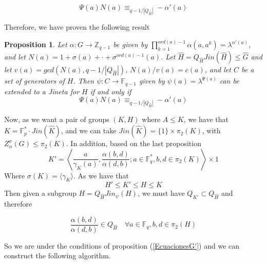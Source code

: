 \documentclass{article}
\newtheorem{proposition}[theorem]{Proposition}
\begin{document}
\begin{equation*}
   \Psi(a)N(a) \equiv_{q-1 /  |Q_{\hat{H}}| } - \alpha'(a)
\end{equation*}

Therefore, we have proven the following result
\begin{proposition}
 Let $\alpha:G\longrightarrow \mathbb{Z}_{q-1}$ be given by $\prod_{k=1}^{ord(a)-1}\alpha(a,a^k) = \lambda^{\alpha'(a)}$, and let $N(a) = 1 + \sigma(a) + \cdot + \sigma^{ord(a)-1}(a)$. Let $\hat{H}=Q_{\hat{H}} Jin(\hat{H}) \leq \hat{G}$ and let $v(a)= gcd(N(a),q-1 /  |Q_{\hat{H}}| )$, $N(a)/v(a)=c(a)$, and let $C$ be a set of generators of $H$. Then $\psi:C \longrightarrow \mathbb{F}_{q-1}$ given by $\psi(a) = \lambda^{\Psi(a)}$ can be extended to a Jineta for $H$ if and only if
    \begin{equation*}
   \Psi(a)N(a) \equiv_{q-1 /  |Q_{\hat{H}}| } - \alpha'(a)
\end{equation*}

\end{proposition}

Now, as we want a pair of groups $(K,H)$ where $A\leq K$, we have that $K=\mathbb{F}_p^* \cdot Jin(\hat{K})$, and we can take $Jin(\hat{K})=\{1\} \times  \pi_2(K)$, with $Z_\alpha^\sigma(G) \leq \pi_2(K)$. In addition, based on the last proposition
    \begin{equation}
        K' = \left\langle \frac{a}{\gamma_K(a)}, \frac{\alpha(b,d) }{\alpha(d,b)}; a\in  \mathbb{F}_q^*, b,d \in \pi_2(K) \right\rangle \times {1}
    \end{equation}
Where $\sigma(K) = \langle \gamma_K\rangle$. As we have that
\begin{equation}
    H' \leq K' \leq H \leq K
\end{equation}
Then given a subgroup $H=Q_{\hat{H}} Jin_\psi(H)$, we must have $Q_{K'} \subset Q_{\hat{H}}$ and therefore

\begin{equation}
   \frac{\alpha(b,d)}{\alpha(d,b)} \in Q_{\hat{H}} \quad \forall a\in \mathbb{F}_q, b,d \in \pi_2(H)
\end{equation}

So we are under the conditions of proposition (\ref{EcuacionesG'}) and we can construct the following algorithm.
\end{document}
